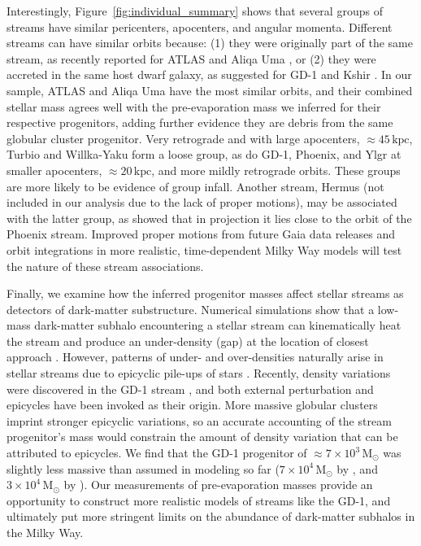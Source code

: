 \documentclass[twocolumn]{aastex63}
\newcommand{\msun}{\ensuremath{\textrm{M}_\odot}}
\newcommand{\kpc}{\ensuremath{\textrm{kpc}}}
\begin{document}
Interestingly, Figure~\ref{fig:individual_summary} shows that several groups of streams have similar pericenters, apocenters, and angular momenta.
Different streams can have similar orbits because: (1) they were originally part of the same stream, as recently reported for ATLAS and Aliqa Uma \citep{li:2020}, or (2) they were accreted in the same host dwarf galaxy, as suggested for GD-1 and Kshir \citep{malhan:2019}.
In our sample, ATLAS and Aliqa Uma have the most similar orbits, and their combined stellar mass agrees well with the pre-evaporation mass we inferred for their respective progenitors, adding further evidence they are debris from the same globular cluster progenitor.
Very retrograde and with large apocenters, $\approx45\,\kpc$, Turbio and Willka-Yaku form a loose group, as do GD-1, Phoenix, and Ylgr at smaller apocenters, $\approx20\,\kpc$, and more mildly retrograde orbits.
These groups are more likely to be evidence of group infall.
Another stream, Hermus (not included in our analysis due to the lack of proper motions), may be associated with the latter group, as \citet{grillmair:2016} showed that in projection it lies close to the orbit of the Phoenix stream.
Improved proper motions from future Gaia data releases and orbit integrations in more realistic, time-dependent Milky Way models \citep[e.g., those that self-consistently include Large Magellanic Cloud and Sagittarius,][]{petersen:2020, garavito-camargo:2020, vasiliev:2020} will test the nature of these stream associations.

Finally, we examine how the inferred progenitor masses affect stellar streams as detectors of dark-matter substructure.
Numerical simulations show that a low-mass dark-matter subhalo encountering a stellar stream can kinematically heat the stream and produce an under-density (gap) at the location of closest approach \citep[e.g.,][]{johnston:2002, ibata:2002, carlberg:2009, yoon:2011, erkal:2015}.
However, patterns of under- and over-densities naturally arise in stellar streams due to epicyclic pile-ups of stars \citep[e.g.,][]{kupper:2008, just:2009, kupper:2010}.
Recently, density variations were discovered in the GD-1 stream \citep{pwb, deboer:2020}, and both external perturbation \citep{bonaca:2019b, banik:2019} and epicycles \citep{ibata:2020} have been invoked as their origin.
More massive globular clusters imprint stronger epicyclic variations, so an accurate accounting of the stream progenitor's mass would constrain the amount of density variation that can be attributed to epicycles.
We find that the GD-1 progenitor of $\approx7\times10^3\,\msun$ was slightly less massive than assumed in modeling so far ($7\times10^4\,\msun$ by \citealt{bonaca:2019b}, and $3\times10^4\,\msun$ by \citealt{ibata:2020}).
Our measurements of pre-evaporation masses provide an opportunity to construct more realistic models of streams like the GD-1, and ultimately put more stringent limits on the abundance of dark-matter subhalos in the Milky Way.
\end{document}
